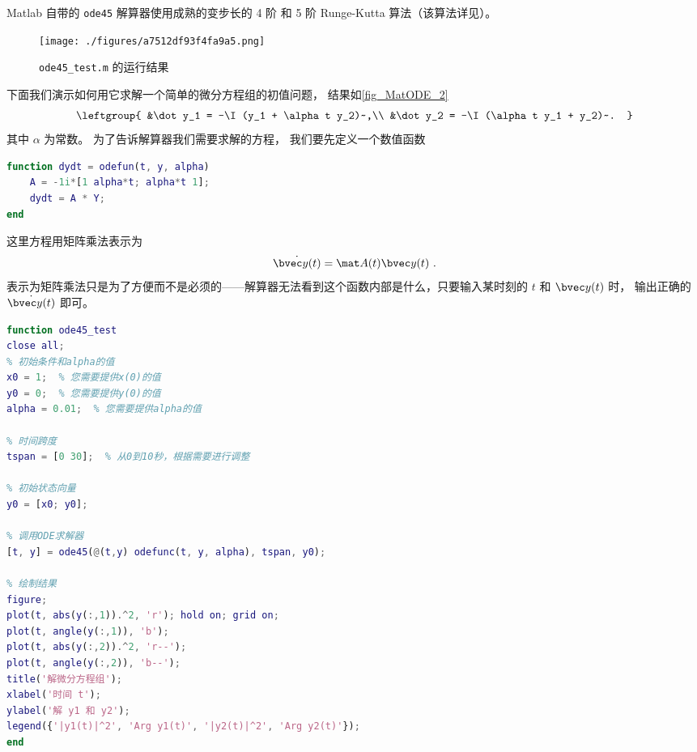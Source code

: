
Matlab 自带的 \verb`ode45` 解算器使用成熟的变步长的 4 阶 和 5 阶 Runge-Kutta 算法（该算法详见）。

\begin{figure}[ht]
\centering
\texttt{[image: ./figures/a7512df93f4fa9a5.png]}
\caption{\verb|ode45_test.m| 的运行结果} \label{fig_MatODE_2}
\end{figure}

下面我们演示如何用它求解一个简单的微分方程组的初值问题， 结果如\autoref{fig_MatODE_2}
\begin{equation}
\leftgroup{
&\dot y_1 = -\I (y_1 + \alpha t y_2)~,\\
&\dot y_2 = -\I (\alpha t y_1 + y_2)~.
}\end{equation}
其中 $\alpha$ 为常数。 为了告诉解算器我们需要求解的方程， 我们要先定义一个数值函数
\begin{lstlisting}[language=matlab,caption=odefun.m]
function dydt = odefun(t, y, alpha)
    A = -1i*[1 alpha*t; alpha*t 1];
    dydt = A * Y;
end
\end{lstlisting}
这里方程用矩阵乘法表示为
\begin{equation}
\dot{\bvec y(t)} = \mat A(t) \bvec y(t)~.
\end{equation}
表示为矩阵乘法只是为了方便而不是必须的——解算器无法看到这个函数内部是什么，只要输入某时刻的 $t$ 和 $\bvec y(t)$ 时， 输出正确的 $\dot{\bvec y(t)}$ 即可。

\begin{lstlisting}[language=matlab,caption=ode45\_test.m]
function ode45_test
close all;
% 初始条件和alpha的值
x0 = 1;  % 您需要提供x(0)的值
y0 = 0;  % 您需要提供y(0)的值
alpha = 0.01;  % 您需要提供alpha的值

% 时间跨度
tspan = [0 30];  % 从0到10秒，根据需要进行调整

% 初始状态向量
y0 = [x0; y0];

% 调用ODE求解器
[t, y] = ode45(@(t,y) odefunc(t, y, alpha), tspan, y0);

% 绘制结果
figure;
plot(t, abs(y(:,1)).^2, 'r'); hold on; grid on;
plot(t, angle(y(:,1)), 'b');
plot(t, abs(y(:,2)).^2, 'r--');
plot(t, angle(y(:,2)), 'b--');
title('解微分方程组');
xlabel('时间 t');
ylabel('解 y1 和 y2');
legend({'|y1(t)|^2', 'Arg y1(t)', '|y2(t)|^2', 'Arg y2(t)'});
end
\end{lstlisting}

